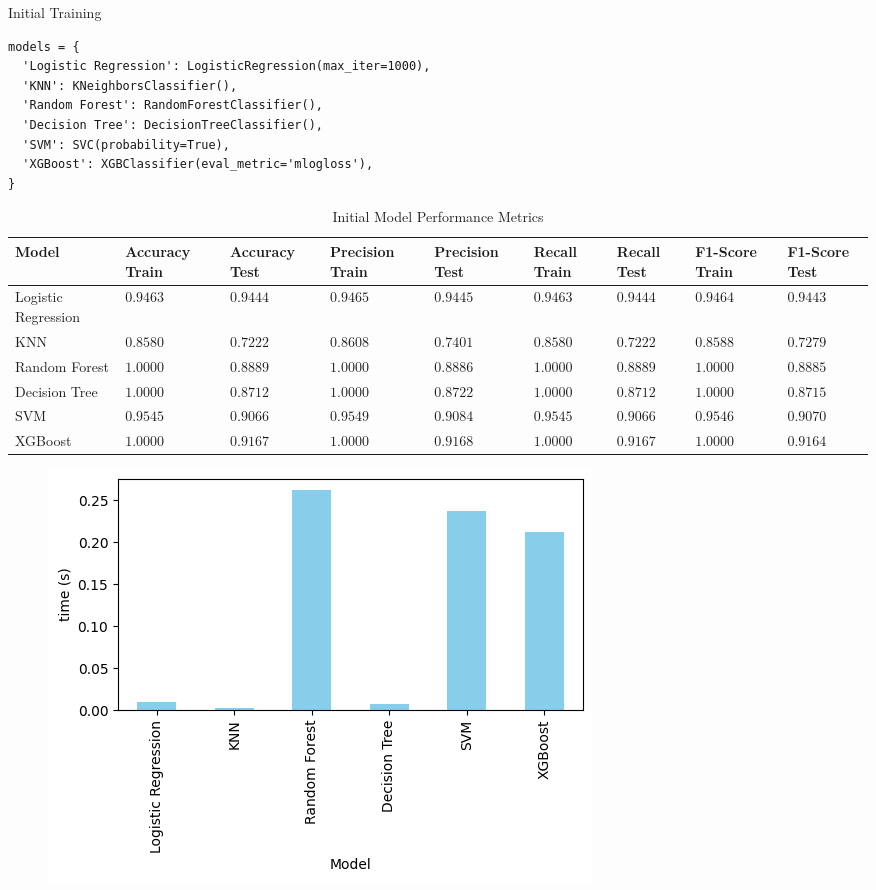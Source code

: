\documentclass[14pt, aspectratio=169]{beamer}
\begin{document}
\begin{frame}{Initial Training}
  \small
  \begin{verbatim}
models = {
  'Logistic Regression': LogisticRegression(max_iter=1000),
  'KNN': KNeighborsClassifier(),
  'Random Forest': RandomForestClassifier(),
  'Decision Tree': DecisionTreeClassifier(),
  'SVM': SVC(probability=True),
  'XGBoost': XGBClassifier(eval_metric='mlogloss'),
}
  \end{verbatim}
  \scriptsize

\begin{table}[H]
  \centering
  \begin{tabular}{p{1.5cm}p{1cm}p{1cm}p{1cm}p{1cm}p{1cm}p{1cm}p{0.75cm}p{0.75cm}}
  \toprule
  \textbf{Model} & \textbf{Accuracy Train} & \textbf{Accuracy Test} & \textbf{Precision Train} & \textbf{Precision Test} & \textbf{Recall Train} & \textbf{Recall Test} & \textbf{F1-Score Train} & \textbf{F1-Score Test}\\
  \toprule
  Logistic Regression & $0.9463$ & $0.9444$ & $0.9465$ & $0.9445$ & $0.9463$ & $0.9444$ & $0.9464$ & $0.9443$ \\
  \midrule
  KNN & $0.8580$ & $0.7222$ & $0.8608$ & $0.7401$ & $0.8580$ & $0.7222$ & $0.8588$ & $0.7279$ \\
  \midrule
  Random Forest & $1.0000$ & $0.8889$ & $1.0000$ & $0.8886$ & $1.0000$ & $0.8889$ & $1.0000$ & $0.8885$ \\
  \midrule
  Decision Tree & $1.0000$ & $0.8712$ & $1.0000$ & $0.8722$ & $1.0000$ & $0.8712$ & $1.0000$ & $0.8715$ \\
  \midrule
  SVM & $0.9545$ & $0.9066$ & $0.9549$ & $0.9084$ & $0.9545$ & $0.9066$ & $0.9546$ & $0.9070$ \\
  \midrule
  XGBoost & $1.0000$ & $0.9167$ & $1.0000$ & $0.9168$ & $1.0000$ & $0.9167$ & $1.0000$ & $0.9164$ \\
  \toprule
  \end{tabular}
  \caption{Initial Model Performance Metrics}
  \label{tab:model_perf_mat}
\end{table}

\begin{figure}[H]
  \centering
  \includegraphics[height=0.5\textwidth]{../report/taining_time.png}
\end{figure}

\end{frame}
\end{document}
